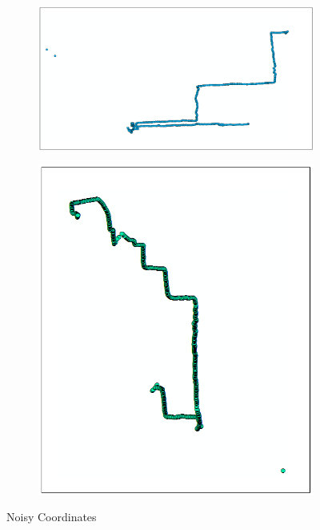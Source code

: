 \documentclass[a4paper,12pt]{article}
\begin{document}
\begin{figure}[!h]
\centering
\begin{subfigure}{0.69\textwidth}
 \centering
 \label{fig:fig5a}
 \includegraphics[scale=0.35]{traj1}
 \caption{}
\end{subfigure}
\hfill 
\begin{subfigure}{0.29\textwidth}
 \centering
 \label{fig:fig5b}
 \includegraphics[scale=0.35]{traj2}
 \caption{}
\end{subfigure}
\caption{Noisy Coordinates}
\label{fig:fig5}
\end{figure}	
	
\end{document}
